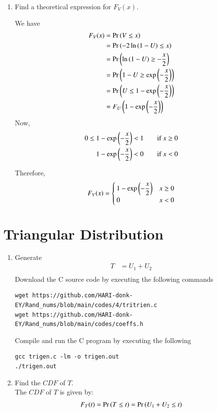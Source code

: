 \documentclass[journal,12pt,twocolumn]{IEEEtran}
\renewcommand\thesection{\arabic{section}}
\begin{document}
\begin{enumerate}[label=\thesection.\arabic*
,ref=\thesection.\theenumi]
\item Find a theoretical expression for $F_V(x)$.

\solution We have
\begin{align}
	F_V(x) &= \Pr\left(V \le x\right) \\
	&= \Pr\left(-2\ln\left(1-U\right) \le x\right) \\
	&= \Pr\left(\ln\left(1-U\right) \ge -\frac{x}{2}\right) \\
	&= \Pr\left(1-U \ge \exp\left(-\frac{x}{2}\right)\right) \\
	&= \Pr\left(U \le 1 - \exp\left(-\frac{x}{2}\right)\right) \\
	&= F_U\left(1 - \exp\left(-\frac{x}{2}\right)\right)
\end{align}
Now,
\begin{align}
	0 \le 1-\exp\left(-\frac{x}{2}\right) &< 1 \qquad \text{if } x \ge 0	\\	
	1-\exp\left(-\frac{x}{2}\right) &< 0 \qquad \text{if } x < 0	
\end{align}

Therefore,
\begin{align}
	F_V(x) = 
	\begin{cases}
		1-\exp\left(-\dfrac{x}{2}\right) & x \ge 0 \\
		0 & x < 0
	\end{cases}
\end{align}

\end{enumerate}

\section{Triangular Distribution}
\begin{enumerate}[label=\thesection.\arabic*
,ref=\thesection.\theenumi]
%
\item 
Generate
\begin{align*}
T & = U_1 + U_2\\
\end{align*}
\solution Download the C source code by executing the following commands
\begin{lstlisting}
wget https://github.com/HARI-donk-EY/Rand_nums/blob/main/codes/4/tritrien.c
wget https://github.com/HARI-donk-EY/Rand_nums/blob/main/codes/coeffs.h

\end{lstlisting}
Compile and run the C program by executing the following
\begin{lstlisting}
gcc trigen.c -lm -o trigen.out
./trigen.out
\end{lstlisting}

\item
Find the $CDF$ of $T$.\\
\solution The $CDF$ of $T$ is given by:
\begin{align}
F_T(t) = \Pr\left(T \leq t\right) = \Pr\left(U_1 + U_2 \leq t\right)
\end{align}

\end{enumerate}
\end{document}

